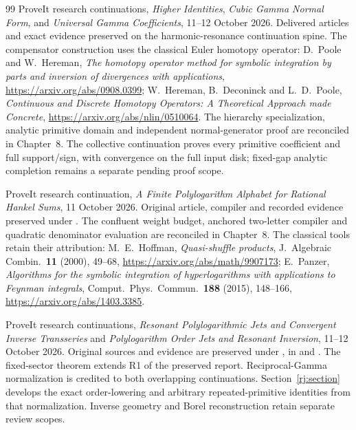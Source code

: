 \begin{thebibliography}{99}
ProveIt research continuations, \emph{Higher Identities},
\emph{Cubic Gamma Normal Form}, and \emph{Universal Gamma Coefficients},
11--12 October 2026. Delivered articles and exact evidence preserved on
the harmonic-resonance continuation spine. The compensator construction
uses the classical Euler homotopy operator: D.~Poole and W.~Hereman,
\emph{The homotopy operator method for symbolic integration by parts and
inversion of divergences with applications},
\url{https://arxiv.org/abs/0908.0399}; W.~Hereman, B.~Deconinck and
L.~D.~Poole, \emph{Continuous and Discrete Homotopy Operators:
A Theoretical Approach made Concrete},
\url{https://arxiv.org/abs/nlin/0510064}.
The hierarchy specialization, analytic primitive domain and independent
normal-generator proof are reconciled in Chapter~8. The collective
continuation proves every primitive coefficient and full support/sign, with
convergence on the full input disk; fixed-gap analytic completion remains
a separate pending proof scope.

ProveIt research continuation, \emph{A Finite Polylogarithm Alphabet for
Rational Hankel Sums}, 11 October 2026. Original article, compiler and
recorded evidence preserved under
.
The confluent weight budget, anchored two-letter compiler and quadratic
denominator evaluation are reconciled in Chapter~8. The classical tools
retain their attribution: M.~E.~Hoffman, \emph{Quasi-shuffle products},
J.~Algebraic Combin.~\textbf{11} (2000), 49--68,
\url{https://arxiv.org/abs/math/9907173}; E.~Panzer,
\emph{Algorithms for the symbolic integration of hyperlogarithms with
applications to Feynman integrals}, Comput.~Phys.~Commun.~\textbf{188}
(2015), 148--166, \url{https://arxiv.org/abs/1403.3385}.

ProveIt research continuations, \emph{Resonant Polylogarithmic Jets and
Convergent Inverse Transseries} and \emph{Polylogarithm Order Jets and
Resonant Inversion}, 11--12 October 2026.
Original sources and evidence are preserved under
,
in  and
.
The fixed-sector theorem extends R1 of the preserved
 report.
Reciprocal-Gamma normalization is credited to both overlapping
continuations. Section~\ref{rj:section} develops the exact order-lowering
and arbitrary repeated-primitive identities from that normalization.
Inverse geometry and Borel reconstruction retain separate review scopes.


\end{thebibliography}
